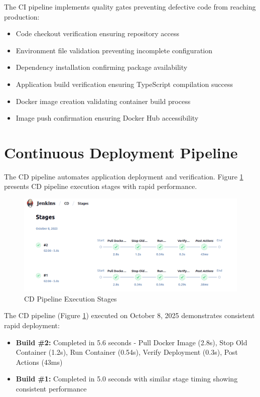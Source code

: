 The CI pipeline implements quality gates preventing defective code from reaching production:
\begin{itemize}
\item Code checkout verification ensuring repository access
\item Environment file validation preventing incomplete configuration
\item Dependency installation confirming package availability
\item Application build verification ensuring TypeScript compilation success
\item Docker image creation validating container build process
\item Image push confirmation ensuring Docker Hub accessibility
\end{itemize}

\section{Continuous Deployment Pipeline}

The CD pipeline automates application deployment and verification. Figure \ref{fig:cd_pipeline} presents CD pipeline execution stages with rapid performance.

\begin{figure}[H]
    \centering
    \includegraphics[width=0.95\linewidth]{img/chap_08/cd.png}
    \caption{CD Pipeline Execution Stages}
    \label{fig:cd_pipeline}
\end{figure}

The CD pipeline (Figure \ref{fig:cd_pipeline}) executed on October 8, 2025 demonstrates consistent rapid deployment:
\begin{itemize}
\item \textbf{Build \#2:} Completed in 5.6 seconds - Pull Docker Image (2.8s), Stop Old Container (1.2s), Run Container (0.54s), Verify Deployment (0.3s), Post Actions (43ms)
\item \textbf{Build \#1:} Completed in 5.0 seconds with similar stage timing showing consistent performance
\end{itemize}

